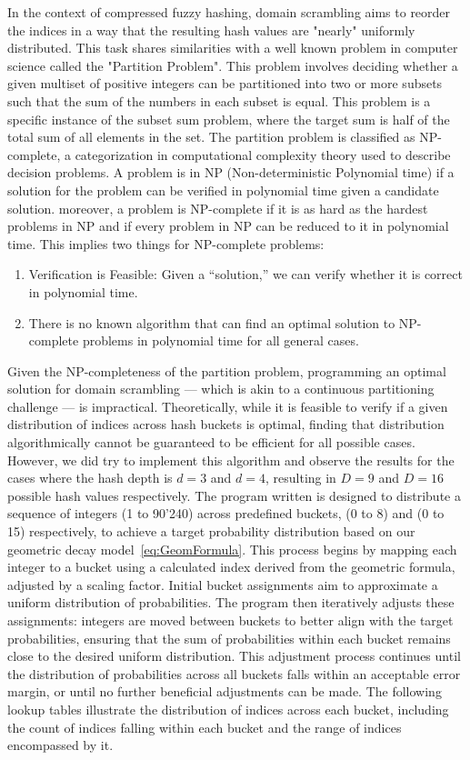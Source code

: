 In the context of compressed fuzzy hashing, domain scrambling aims to reorder the indices in a way that the resulting hash values are "nearly" uniformly distributed. This task shares similarities with a well known problem in computer science called the "Partition Problem". This problem involves deciding whether a given multiset of positive integers can be partitioned into two or more subsets such that the sum of the numbers in each subset is equal. This problem is a specific instance of the subset sum problem, where the target sum is half of the total sum of all elements in the set. The partition problem is classified as NP-complete, a categorization in computational complexity theory used to describe decision problems. A problem is in NP (Non-deterministic Polynomial time) if a solution for the problem can be verified in polynomial time given a candidate solution. moreover, a problem is NP-complete if it is as hard as the hardest problems in NP and if every problem in NP can be reduced to it in polynomial time. This implies two things for NP-complete problems:

\begin{enumerate}
    \item Verification is Feasible: Given a ``solution,'' we can verify whether it is correct in polynomial time.
    \item There is no known algorithm that can find an optimal solution to NP-complete problems in polynomial time for all general cases.
\end{enumerate}

Given the NP-completeness of the partition problem, programming an optimal solution for domain scrambling — which is akin to a continuous partitioning challenge — is impractical. Theoretically, while it is feasible to verify if a given distribution of indices across hash buckets is optimal, finding that distribution algorithmically cannot be guaranteed to be efficient for all possible cases. However, we did try to implement this algorithm and observe the results for the cases where the hash depth is \(d=3\) and \(d=4\), resulting in \(D=9\) and \(D=16\) possible hash values respectively. The program written is designed to distribute a sequence of integers (1 to 90'240) across predefined buckets, (0 to 8) and (0 to 15) respectively, to achieve a target probability distribution based on our geometric decay model~\ref{eq:GeomFormula}. This process begins by mapping each integer to a bucket using a calculated index derived from the geometric formula, adjusted by a scaling factor. Initial bucket assignments aim to approximate a uniform distribution of probabilities. The program then iteratively adjusts these assignments: integers are moved between buckets to better align with the target probabilities, ensuring that the sum of probabilities within each bucket remains close to the desired uniform distribution. This adjustment process continues until the distribution of probabilities across all buckets falls within an acceptable error margin, or until no further beneficial adjustments can be made. The following lookup tables illustrate the distribution of indices across each bucket, including the count of indices falling within each bucket and the range of indices encompassed by it.

